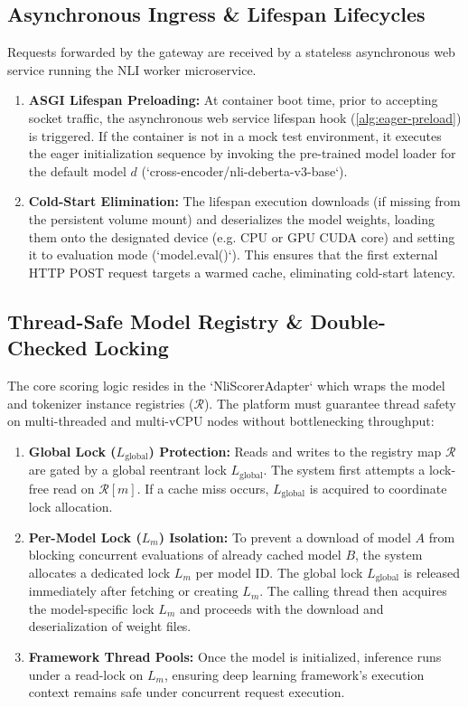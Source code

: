 \documentclass[11pt,a4paper]{article}
\theoremstyle{plain}
\theoremstyle{definition}
\theoremstyle{remark}
\newcommand{\Lm}{L_m}
\newcommand{\Lg}{L_{\mathrm{global}}}
\begin{document}
\subsection{Asynchronous Ingress \& Lifespan Lifecycles}
Requests forwarded by the gateway are received by a stateless asynchronous web service running the NLI worker microservice.
\begin{enumerate}
    \item \textbf{ASGI Lifespan Preloading:} At container boot time, prior to accepting socket traffic, the asynchronous web service lifespan hook (\cref{alg:eager-preload}) is triggered. If the container is not in a mock test environment, it executes the eager initialization sequence by invoking the pre-trained model loader for the default model $d$ (`cross-encoder/nli-deberta-v3-base`).
    \item \textbf{Cold-Start Elimination:} The lifespan execution downloads (if missing from the persistent volume mount) and deserializes the model weights, loading them onto the designated device (e.g. CPU or GPU CUDA core) and setting it to evaluation mode (`model.eval()`). This ensures that the first external HTTP POST request targets a warmed cache, eliminating cold-start latency.
\end{enumerate}

\subsection{Thread-Safe Model Registry \& Double-Checked Locking}
The core scoring logic resides in the `NliScorerAdapter` which wraps the model and tokenizer instance registries ($\mathcal{R}$). The platform must guarantee thread safety on multi-threaded and multi-vCPU nodes without bottlenecking throughput:
\begin{enumerate}
    \item \textbf{Global Lock ($\Lg$) Protection:} Reads and writes to the registry map $\mathcal{R}$ are gated by a global reentrant lock $\Lg$. The system first attempts a lock-free read on $\mathcal{R}[m]$. If a cache miss occurs, $\Lg$ is acquired to coordinate lock allocation.
    \item \textbf{Per-Model Lock ($\Lm$) Isolation:} To prevent a download of model $A$ from blocking concurrent evaluations of already cached model $B$, the system allocates a dedicated lock $\Lm$ per model ID. The global lock $\Lg$ is released immediately after fetching or creating $\Lm$. The calling thread then acquires the model-specific lock $\Lm$ and proceeds with the download and deserialization of weight files.
    \item \textbf{Framework Thread Pools:} Once the model is initialized, inference runs under a read-lock on $\Lm$, ensuring deep learning framework's execution context remains safe under concurrent request execution.
\end{enumerate}
\end{document}
